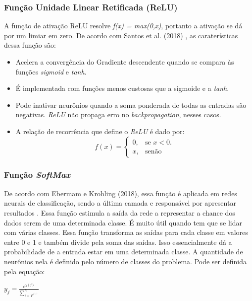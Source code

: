 \subsubsection{Função Unidade Linear Retificada (ReLU) \cite{russell2002artificial}}

A função de ativação ReLU resolve \textit{f(x) = max(0,x)}, portanto a ativação se dá por um limiar em zero. De acordo com Santos et al. (2018) \nocite{santos2018identificaccao}, as caraterísticas dessa função são:

\begin{itemize}
    \item Acelera a convergência do Gradiente descendente quando se compara às funções \textit{sigmoid} e \textit{tanh}.
    \item É implementada com funções menos custosas que a sigmoide e a \textit{tanh}.
    \item Pode inativar neurônios quando a soma ponderada de todas as entradas são negativas. \textit{ReLU} não propaga erro no \textit{backpropagation}, nesses casos.
    \item A relação de recorrência que define o \textit{ReLU} é dado por:
    \begin{equation}
        f(x)=\begin{cases}
        0, & \text{se $x<0$}.\\
        x, & \text{senão}
        \end{cases}
    \end{equation}
\end{itemize}

\subsubsection{Função \textit{SoftMax}}

De acordo com Ebermam e Krohling (2018), essa função é aplicada em redes neurais de classificação, sendo a última camada e responsável por apresentar resultados . Essa função estimula a saída da rede a representar a chance dos dados serem de uma determinada classe. É muito útil quando tem que se lidar com várias classes. Essa função transforma as saídas para cada classe em valores entre 0 e 1 e também divide pela soma das saídas. Isso essencialmente dá a probabilidade de a entrada estar em uma determinada classe. A quantidade de neurônios nela é definido pelo número de classes do problema. Pode ser definida pela equação:

\begin{center}
$y_{j} = \frac{e^{y(j)}}{\sum_{i=1^{e^{y(i)}}}^{n}}$
    
\end{center}

